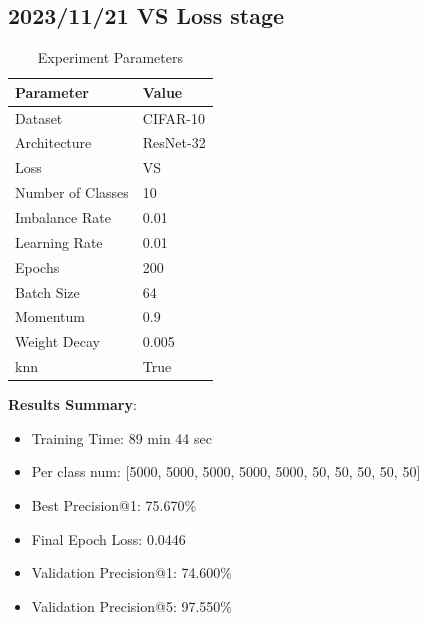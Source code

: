 \documentclass{article}
\begin{document}
\begin{multicols}{2} %
\section{2023/11/21 VS Loss stage}
\begin{table}[H]
\centering
\caption{Experiment Parameters}
\label{tab:parameters}
\begin{tabular}{ll}
\toprule
Parameter & Value \\
\midrule
Dataset & CIFAR-10 \\
Architecture & ResNet-32 \\
Loss & VS \\
Number of Classes & 10 \\
Imbalance Rate & 0.01 \\
Learning Rate & 0.01 \\
Epochs & 200 \\
Batch Size & 64 \\
Momentum & 0.9 \\
Weight Decay & 0.005 \\
knn & True \\
\bottomrule
\end{tabular}
\end{table}

\textbf{Results Summary}:
\begin{itemize}
    \item Training Time: 89 min 44 sec
    \item Per class num: [5000, 5000, 5000, 5000, 5000, 50, 50, 50, 50, 50]
    \item Best Precision@1: 75.670\%  
    \item Final Epoch Loss: 0.0446
    \item Validation Precision@1: 74.600\%
    \item Validation Precision@5: 97.550\%
\end{itemize}


\end{multicols}
\end{document}
